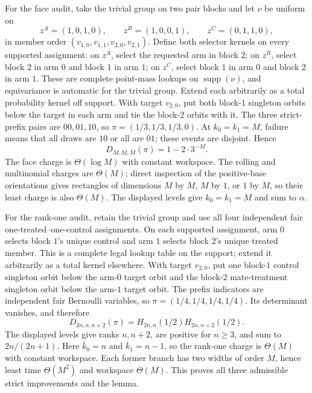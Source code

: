 For the face audit, take the trivial group on two pair blocks and let \(\nu\) be uniform on
\[
z^A=(1,0,1,0),\qquad z^B=(1,0,0,1),\qquad z^C=(0,1,1,0),
\tag{8}
\]
in member order \((v_{1,0},v_{1,1},v_{2,0},v_{2,1})\). Define both selector kernels on every supported assignment: on \(z^A\), select the requested arm in block \(2\); on \(z^B\), select block \(2\) in arm \(0\) and block \(1\) in arm \(1\); on \(z^C\), select block \(1\) in arm \(0\) and block \(2\) in arm \(1\). These are complete point-mass lookups on \(\operatorname{supp}(\nu)\), and equivariance is automatic for the trivial group. Extend each arbitrarily as a total probability kernel off support. With target \(v_{2,0}\), put both block-\(1\) singleton orbits below the target in each arm and tie the block-\(2\) orbits with it. The three strict-prefix pairs are \(00,01,10\), so \(\pi=(1/3,1/3,1/3,0)\). At \(k_0=k_1=M\), failure means that all draws are \(10\) or all are \(01\); these events are disjoint. Hence
\[
D_{M,M,M}(\pi)=1-2\cdot3^{-M}.
\]
The face charge is \(\Theta(\log M)\) with constant workspace. The rolling and multinomial charges are \(\Theta(M)\); direct inspection of the positive-base orientations gives rectangles of dimensions \(M\) by \(M\), \(M\) by \(1\), or \(1\) by \(M\), so their least charge is also \(\Theta(M)\). The displayed levels give \(k_0=k_1=M\) and sum to \(\alpha\).

For the rank-one audit, retain the trivial group and use all four independent fair one-treated--one-control assignments. On each supported assignment, arm \(0\) selects block \(1\)'s unique control and arm \(1\) selects block \(2\)'s unique treated member. This is a complete legal lookup table on the support; extend it arbitrarily as a total kernel elsewhere. With target \(v_{2,0}\), put one block-\(1\) control singleton orbit below the arm-\(0\) target orbit and the block-\(2\) mate-treatment singleton orbit below the arm-\(1\) target orbit. The prefix indicators are independent fair Bernoulli variables, so \(\pi=(1/4,1/4,1/4,1/4)\). Its determinant vanishes, and therefore
\[
D_{2n,n,n+2}(\pi)=H_{2n,n}(1/2)H_{2n,n+2}(1/2).
\]
The displayed levels give ranks \(n,n+2\), are positive for \(n\ge3\), and sum to \(2n/(2n+1)\). Here \(\bar k_0=n\) and \(\bar k_1=n-1\), so the rank-one charge is \(\Theta(M)\) with constant workspace. Each former branch has two widths of order \(M\), hence least time \(\Theta(M^2)\) and workspace \(\Theta(M)\). This proves all three admissible strict improvements and the lemma.
